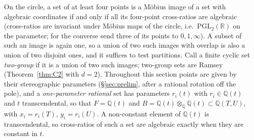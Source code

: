 \documentclass[11pt]{amsart}
\newcommand{\Q}{\mathbb{Q}}
\newcommand{\R}{\mathbb{R}}
\theoremstyle{plain}
\theoremstyle{definition}
\begin{document}
On the circle, a set of at least four points is a M\"obius image of a set with algebraic coordinates if
and only if all its four-point cross-ratios are algebraic (cross-ratios are invariant under M\"obius maps
of the circle, i.e.\ $\mathrm{PGL}_2(\R)$ on the parameter; for the converse send three of its points to
$0,1,\infty$). A subset of such an image is again one, so a union of two such images with overlap is
also a union of two disjoint ones, and it suffices to test partitions.
Call a finite cyclic set \emph{two-group} if it is a union of two such images; two-group sets are Ramsey
(Theorem~\ref{thm:C2} with $d=2$). Throughout this section points are given by their stereographic
parameters (\S\ref{sec:prelim}, after a rational rotation off the pole), and a \emph{one-parameter
rational} set has parameters $r_i(t)$ with $r_i\in\Q(t)$ and $t$ transcendental, so that $F=\Q(t)$ and
$B=\Q(t)\otimes_\Q\Q(t)\subset\Q(T,U)$, with $x_i=r_i(T)$, $y_i=r_i(U)$. A non-constant element of $\Q(t)$
is transcendental, so cross-ratios of such a set are algebraic exactly when they are constant in $t$.
\end{document}
